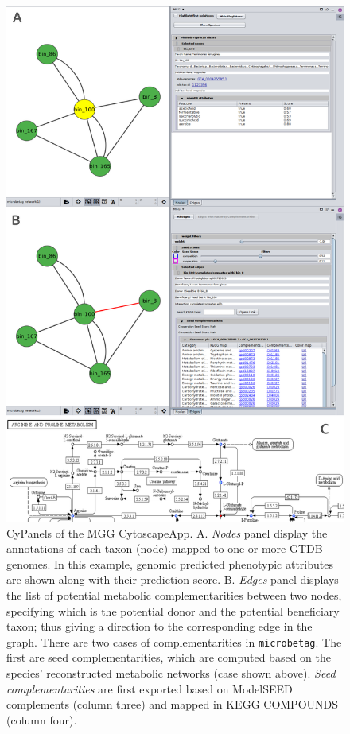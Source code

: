 \documentclass[sn-mathphys,Numbered]{sn-jnl}  %
\theoremstyle{thmstyleone}%
\theoremstyle{thmstyletwo}%
\theoremstyle{thmstylethree}%
\newcommand{\microbetag}{\texttt{microbetag}}
\begin{document}
        \begin{figure}[H]
            \centering
            \includegraphics*[width=0.85\columnwidth]{figs/cyPanel.png}
            \caption{
                CyPanels of the MGG CytoscapeApp. 
                A. \textit{Nodes} panel display the annotations of each taxon (node) mapped to one or more GTDB genomes.
                In this example, genomic predicted phenotypic attributes are shown along with their prediction score.
                B. \textit{Edges} panel displays the list of potential metabolic complementarities between two nodes, specifying which is the potential donor and the potential beneficiary taxon; thus giving a direction to the corresponding edge in the graph. 
                There are two cases of complementarities in \microbetag.
                The first are seed complementarities, which are computed based on the species' reconstructed metabolic networks (case shown above). 
                \textit{Seed complementarities} are first exported based on ModelSEED complements (column three) and mapped in KEGG COMPOUNDS (column four).
}
\end{figure}
\end{document}
